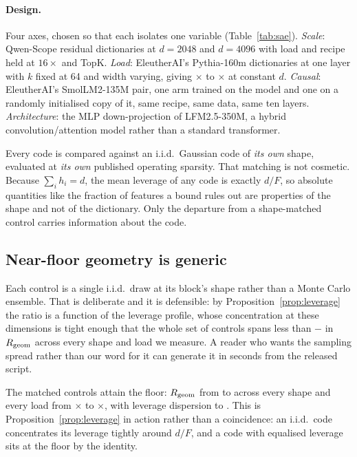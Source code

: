 \paragraph{Design.} Four axes, chosen so that each isolates one variable
(Table~\ref{tab:sae}). \emph{Scale}: Qwen-Scope residual dictionaries at $d=2048$ and $d=4096$ with
load and recipe held at $16\times$ and TopK. \emph{Load}: EleutherAI's Pythia-160m dictionaries at
one layer with $k$ fixed at 64 and width varying, giving \SaeLoadOneLoad$\times$ to
\SaeLoadThreeLoad$\times$ at constant $d$. \emph{Causal}: EleutherAI's SmolLM2-135M pair, one arm
trained on the model and one on a randomly initialised copy of it, same recipe, same data, same ten
layers. \emph{Architecture}: the MLP down-projection of LFM2.5-350M, a hybrid convolution/attention
model rather than a standard transformer.

Every code is compared against an i.i.d.\ Gaussian code of \emph{its own} shape, evaluated at
\emph{its own} published operating sparsity. That matching is not cosmetic. Because $\sum_i h_i=d$,
the mean leverage of any code is exactly $d/F$, so absolute quantities like the fraction of features
a bound rules out are properties of the shape and not of the dictionary. Only the departure from a
shape-matched control carries information about the code.

\subsection{Near-floor geometry is generic}

Each control is a single i.i.d.\ draw at its block's shape rather than a Monte Carlo ensemble.
That is deliberate and it is defensible: by Proposition~\ref{prop:leverage} the ratio is a function
of the leverage profile, whose concentration at these dimensions is tight enough that the whole set
of controls spans less than \SaeCtlRgeomMax{} $-$ \SaeCtlRgeomMin{} in $R_{\mathrm{geom}}$ across every shape
and load we measure. A reader who wants the sampling spread rather than our word for it can generate
it in seconds from the released script.

The \SaeControls{} matched controls attain the floor: $R_{\mathrm{geom}}$ from \SaeCtlRgeomMin{} to
\SaeCtlRgeomMax{} across every shape and every load from \SaeLoadMin$\times$ to
\SaeLoadMax$\times$, with leverage dispersion \SaeCtlCvMin{} to \SaeCtlCvMax{}. This is
Proposition~\ref{prop:leverage} in action rather than a coincidence: an i.i.d.\ code concentrates its
leverage tightly around $d/F$, and a code with equalised leverage sits at the floor by the identity.

